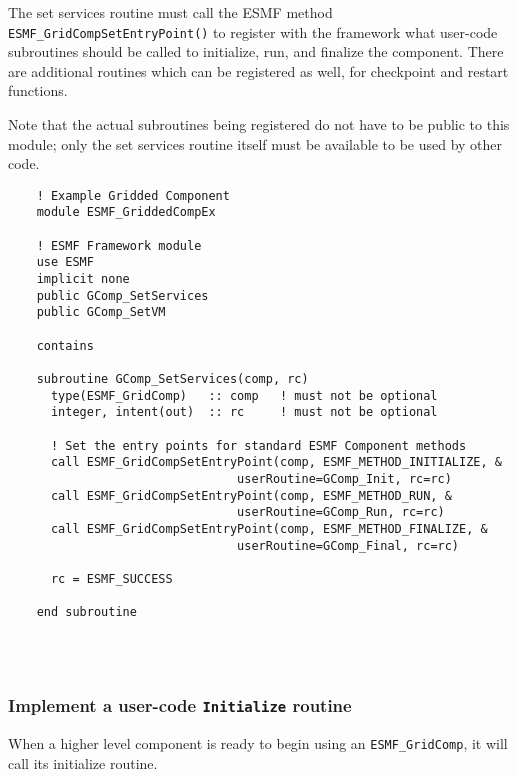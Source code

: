    The set services routine must call the ESMF method 
   {\tt ESMF\_GridCompSetEntryPoint()} to
   register with the framework what user-code subroutines should be called 
   to initialize, run, and finalize the component.  There are
   additional routines which can be registered as well, for checkpoint
   and restart functions.
  
   Note that the actual subroutines being registered do not have to be
   public to this module; only the set services routine itself must
   be available to be used by other code. 

 \begin{verbatim}
    ! Example Gridded Component
    module ESMF_GriddedCompEx
    
    ! ESMF Framework module
    use ESMF
    implicit none
    public GComp_SetServices
    public GComp_SetVM

    contains

    subroutine GComp_SetServices(comp, rc)
      type(ESMF_GridComp)   :: comp   ! must not be optional
      integer, intent(out)  :: rc     ! must not be optional

      ! Set the entry points for standard ESMF Component methods
      call ESMF_GridCompSetEntryPoint(comp, ESMF_METHOD_INITIALIZE, &
                                userRoutine=GComp_Init, rc=rc)
      call ESMF_GridCompSetEntryPoint(comp, ESMF_METHOD_RUN, &
                                userRoutine=GComp_Run, rc=rc)
      call ESMF_GridCompSetEntryPoint(comp, ESMF_METHOD_FINALIZE, &
                                userRoutine=GComp_Final, rc=rc)

      rc = ESMF_SUCCESS

    end subroutine
 
\end{verbatim}
 
 
\mbox{}\hrulefill\ 
 

  \subsubsection{Implement a user-code {\tt Initialize} routine}
   
   \label{sec:GridInitialize}
  
  
   When a higher level component is ready to begin using an 
   {\tt ESMF\_GridComp}, it will call its initialize routine.
  
